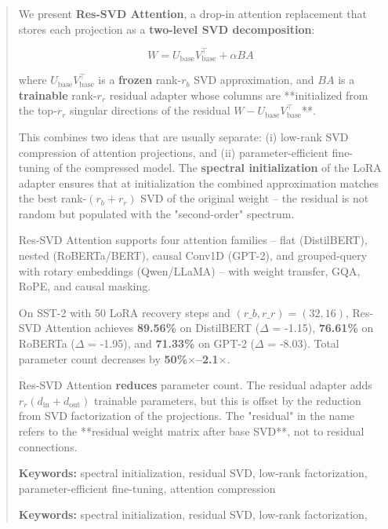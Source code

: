 \documentclass{article}
\begin{document}
\maketitle

\begin{abstract}
We present \textbf{Res-SVD Attention}, a drop-in attention replacement that stores 
each projection as a \textbf{two-level SVD decomposition}:

\[
W = U_\text{base} V_\text{base}^\top + \alpha B A
\tag{1}
\]

where $U_\text{base} V_\text{base}^\top$ is a \textbf{frozen} rank-$r_b$ SVD 
approximation, and $B A$ is a \textbf{trainable} rank-$r_r$ residual adapter 
whose columns are **initialized from the top-$r_r$ singular directions of 
the residual $W - U_\text{base} V_\text{base}^\top$**.

This combines two ideas that are usually separate: (i) low-rank SVD 
compression of attention projections, and (ii) parameter-efficient 
fine-tuning of the compressed model. The \textbf{spectral initialization} of the 
LoRA adapter ensures that at initialization the combined approximation 
matches the best rank-$(r_b + r_r)$ SVD of the original weight -- the 
residual is not random but populated with the "second-order" spectrum.

Res-SVD Attention supports four attention families -- flat (DistilBERT), 
nested (RoBERTa/BERT), causal Conv1D (GPT-2), and grouped-query with rotary 
embeddings (Qwen/LLaMA) -- with weight transfer, GQA, RoPE, and causal 
masking.

On SST-2 with 50 LoRA recovery steps and $(r\_b, r\_r) = 
(32, 16)$, Res-SVD Attention achieves 
\textbf{89.56\%} on DistilBERT ($\Delta$ = -1.15), \textbf{76.61\%} on RoBERTa 
($\Delta$ = -1.95), and \textbf{71.33\%} on GPT-2 ($\Delta$ = -8.03). Total 
parameter count decreases by \textbf{50\%$\times$--2.1$\times$}.

Res-SVD Attention \textbf{reduces} parameter count. The residual adapter adds 
$r_r(d_\text{in} + d_\text{out})$ trainable parameters, but this is 
offset by the reduction from SVD factorization of the projections. The 
"residual" in the name refers to the **residual weight matrix after base 
SVD**, not to residual connections.

\textbf{Keywords:} spectral initialization, residual SVD, low-rank factorization, 
parameter-efficient fine-tuning, attention compression



\vspace{0.5em}
\noindent\textbf{Keywords:} spectral initialization, residual SVD, low-rank factorization,
\end{abstract}
\end{document}
